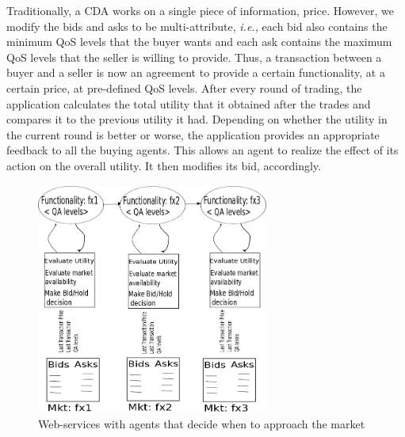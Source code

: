 \documentclass[10pt,journal,compsoc]{IEEEtran}
\begin{document}
Traditionally, a CDA works on a single piece of information, price. However, we modify the bids and asks to be multi-attribute, \textit{i.e.,} each bid also contains the minimum QoS levels that the buyer wants and each ask contains the maximum QoS levels that the seller is willing to provide. Thus, a transaction between a buyer and a seller is now an agreement to provide a certain functionality, at a certain price, at pre-defined QoS levels.
After every round of trading, the application calculates the total utility that it obtained after the trades and compares it to the previous utility it had. Depending on whether the utility in the current round is better or worse, the application provides an appropriate feedback to all the buying agents. This allows an agent to realize the effect of its action on the overall utility. It then modifies its bid, accordingly.

\begin{figure} 
    \centering
    \includegraphics[width=3in, height=3in]{drawings/buyers-and-market.png}
  \caption{Web-services with agents that decide when to approach the market}
 \label{marketplace}
 \end{figure}
 
\end{document}
